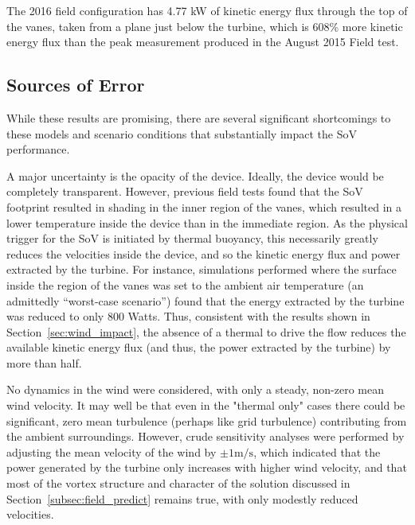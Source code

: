 The 2016 field configuration has 4.77 kW of kinetic energy flux through
the top of the vanes, taken from a plane just below the turbine, which
is 608\% more kinetic energy flux than the peak measurement produced in
the August 2015 Field test.  

\subsection{Sources of Error}
\label{sec:field_error}
%
While these results are promising, there are several significant
shortcomings to these models and scenario conditions that substantially
impact the SoV performance. 

A major uncertainty is the opacity of the device. Ideally, the device
would be completely transparent. However, previous field tests
found that the SoV footprint resulted in shading in the inner region of
the vanes, which resulted in a lower temperature inside the device than
in the immediate region. As the physical trigger for the SoV is
initiated by thermal buoyancy, this necessarily greatly reduces the
velocities inside the device, and so the kinetic energy flux and power
extracted by the turbine. For instance, simulations performed where the
surface inside the region of the vanes was set to the ambient air
temperature (an admittedly ``worst-case scenario'') found that the
energy extracted by the turbine was reduced to only 800 Watts. Thus,
consistent with the results shown in Section~\ref{sec:wind_impact}, the
absence of a thermal to drive the flow reduces the available kinetic
energy flux (and thus, the power extracted by the turbine) by more than
half. 





No dynamics in the wind were considered, with only a steady,
non-zero mean wind velocity. It may well be that even in the "thermal
only" cases there could be significant, zero mean turbulence (perhaps
like grid turbulence) contributing from the ambient
surroundings. However, crude sensitivity analyses were performed by
adjusting the mean velocity of the wind by  $\pm 1 \text{m}/\text{s}$,
which indicated that the power generated by the turbine only increases
with higher wind velocity, and that most of the vortex structure and
character of the solution discussed in
Section~\ref{subsec:field_predict} remains true, with only modestly
reduced velocities. 

